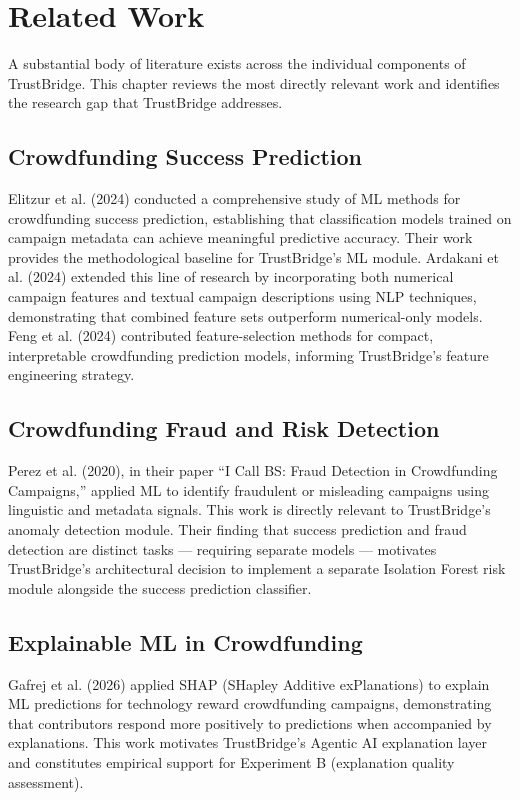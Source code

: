 \chapter{Related Work}

A substantial body of literature exists across the individual components of TrustBridge. This chapter reviews the most directly relevant work and identifies the research gap that TrustBridge addresses.

\section{Crowdfunding Success Prediction}

Elitzur et al. (2024) conducted a comprehensive study of ML methods for crowdfunding success prediction, establishing that classification models trained on campaign metadata can achieve meaningful predictive accuracy. Their work provides the methodological baseline for TrustBridge's ML module. Ardakani et al. (2024) extended this line of research by incorporating both numerical campaign features and textual campaign descriptions using NLP techniques, demonstrating that combined feature sets outperform numerical-only models. Feng et al. (2024) contributed feature-selection methods for compact, interpretable crowdfunding prediction models, informing TrustBridge's feature engineering strategy.

\section{Crowdfunding Fraud and Risk Detection}

Perez et al. (2020), in their paper ``I Call BS: Fraud Detection in Crowdfunding Campaigns,'' applied ML to identify fraudulent or misleading campaigns using linguistic and metadata signals. This work is directly relevant to TrustBridge's anomaly detection module. Their finding that success prediction and fraud detection are distinct tasks — requiring separate models — motivates TrustBridge's architectural decision to implement a separate Isolation Forest risk module alongside the success prediction classifier.

\section{Explainable ML in Crowdfunding}

Gafrej et al. (2026) applied SHAP (SHapley Additive exPlanations) to explain ML predictions for technology reward crowdfunding campaigns, demonstrating that contributors respond more positively to predictions when accompanied by explanations. This work motivates TrustBridge's Agentic AI explanation layer and constitutes empirical support for Experiment B (explanation quality assessment).

